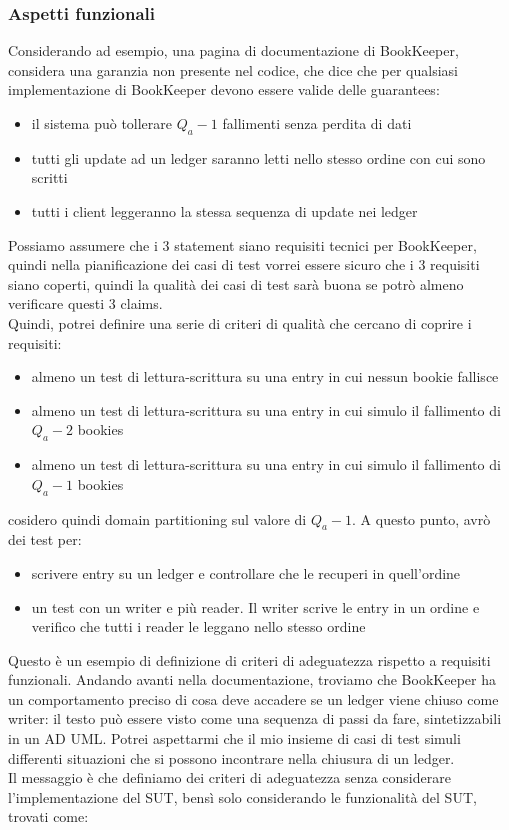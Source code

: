 \documentclass{article}
\begin{document}
\subsubsection{Aspetti funzionali}
Considerando ad esempio, una pagina di documentazione di BookKeeper, considera una garanzia non presente nel codice, che dice che per qualsiasi implementazione di BookKeeper devono essere valide delle guarantees:
\begin{itemize}
\item il sistema può tollerare $Q_a - 1$ fallimenti senza perdita di dati
\item tutti gli update ad un ledger saranno letti nello stesso ordine con cui sono scritti
\item tutti i client leggeranno la stessa sequenza di update nei ledger
\end{itemize}
Possiamo assumere che i 3 statement siano requisiti tecnici per BookKeeper, quindi nella pianificazione dei casi di test vorrei essere sicuro che i 3 requisiti siano coperti, quindi la qualità dei casi di test sarà buona se potrò almeno verificare questi 3 claims.\\ Quindi, potrei definire una serie di criteri di qualità che cercano di coprire i requisiti:
\begin{itemize}
\item almeno un test di lettura-scrittura su una entry in cui nessun bookie fallisce
\item almeno un test di lettura-scrittura su una entry in cui simulo il fallimento di $Q_a - 2$ bookies
\item almeno un test di lettura-scrittura su una entry in cui simulo il fallimento di $Q_a - 1$ bookies
\end{itemize}
cosidero quindi domain partitioning sul valore di $Q_a -1$. A questo punto, avrò dei test per:
\begin{itemize}
\item scrivere entry su un ledger e controllare che le recuperi in quell'ordine
\item un test con un writer e più reader. Il writer scrive le entry in un ordine e verifico che tutti i reader le leggano nello stesso ordine
\end{itemize}
Questo è un esempio di definizione di criteri di adeguatezza rispetto a requisiti funzionali. Andando avanti nella documentazione, troviamo che BookKeeper ha un comportamento preciso di cosa deve accadere se un ledger viene chiuso come writer: il testo può essere visto come una sequenza di passi da fare, sintetizzabili in un AD UML. Potrei aspettarmi che il mio insieme di casi di test simuli differenti situazioni che si possono incontrare nella chiusura di un ledger.\\ Il messaggio è che definiamo dei criteri di adeguatezza senza considerare l'implementazione del SUT, bensì solo considerando le funzionalità del SUT, trovati come:
\end{document}

